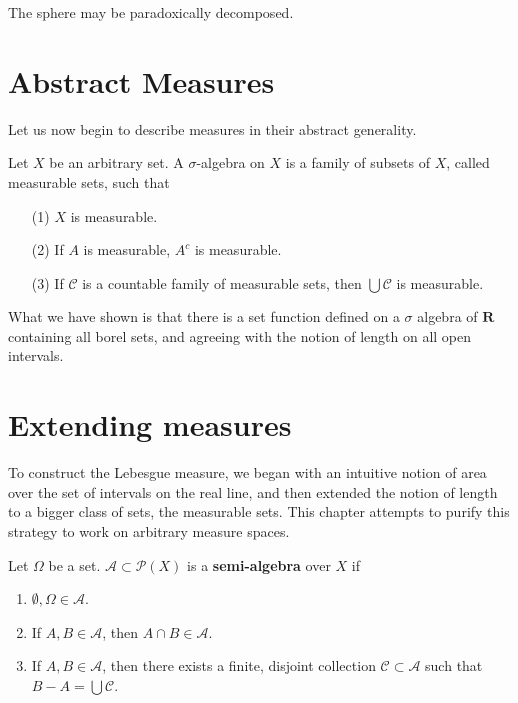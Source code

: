 \begin{theorem}
    The sphere may be paradoxically decomposed.
\end{theorem}




\chapter{Abstract Measures}

Let us now begin to describe measures in their abstract generality.

\begin{definition}
    Let $X$ be an arbitrary set. A $\sigma$-algebra on $X$ is a family of subsets of $X$, called measurable sets, such that
    \begin{enumerate}
        \item[(1)] $X$ is measurable.
        \item[(2)] If $A$ is measurable, $A^c$ is measurable.
        \item[(3)] If $\mathcal{C}$ is a countable family of measurable sets, then $\bigcup \mathcal{C}$ is measurable.
    \end{enumerate}
\end{definition}

What we have shown is that there is a set function defined on a $\sigma$ algebra of $\mathbf{R}$ containing all borel sets, and agreeing with the notion of length on all open intervals.

\chapter{Extending measures}

To construct the Lebesgue measure, we began with an intuitive notion of area over the set of intervals on the real line, and then extended the notion of length to a bigger class of sets, the measurable sets. This chapter attempts to purify this strategy to work on arbitrary measure spaces.

\begin{definition}
    Let $\Omega$ be a set. $\mathcal{A} \subset \mathcal{P}(X)$ is a {\bf semi-algebra} over $X$ if
    \begin{enumerate}
        \item $\emptyset, \Omega \in \mathcal{A}$.
        \item If $A,B \in \mathcal{A}$, then $A \cap B \in \mathcal{A}$.
        \item If $A,B \in \mathcal{A}$, then there exists a finite, disjoint collection $\mathcal{C} \subset \mathcal{A}$ such that $B - A = \bigcup \mathcal{C}$.
    \end{enumerate}
\end{definition}


